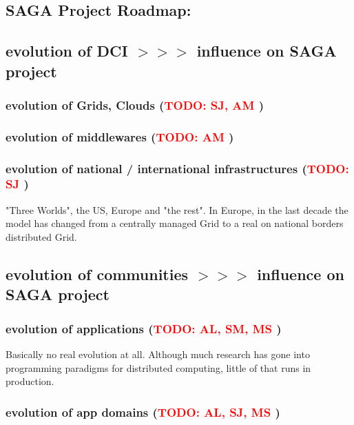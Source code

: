\documentclass{article}
\newcommand{\B}[1]{\textbf{#1}}
\newcommand{\nind}{\noindent}
\newcommand{\todo}[1]{{\textcolor{red}{\B{TODO:} #1 }}}
\begin{document}
 \subsection{ SAGA Project Roadmap:}


 \subsection{ evolution of DCI $>>>$ influence on SAGA project}
 \subsubsection{ evolution of Grids, Clouds (\todo{SJ, AM})}
 \subsubsection{ evolution of middlewares (\todo{AM})}
 \subsubsection{ evolution of national / international infrastructures (\todo{SJ})}

 "Three Worlds", the US, Europe and "the rest".  In Europe, in the
 last decade the model has changed from a centrally managed Grid to a
 real on national borders distributed Grid.\\

 
 \nind
 \subsection{ evolution of communities  $>>>$ influence on SAGA project}
 \subsubsection{ evolution of applications (\todo{AL, SM, MS})}
 
 Basically no real evolution at all. Although much research has gone
 into programming paradigms for distributed computing, little of that
 runs in production.
 
 \subsubsection{ evolution of app domains (\todo{AL, SJ, MS})}
 
\end{document}

